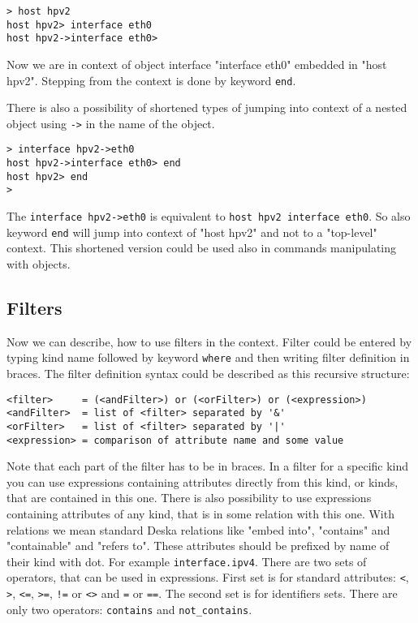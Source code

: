 \documentclass[deska]{subfiles}
\begin{document}
\begin{verbatim}
> host hpv2
host hpv2> interface eth0
host hpv2->interface eth0>
\end{verbatim}

Now we are in context of object interface "interface eth0" embedded in "host hpv2". Stepping from the context is done by
keyword {\tt end}.

There is also a possibility of shortened types of jumping into context of a nested object using {\tt ->} in the name of the
object.

\begin{verbatim}
> interface hpv2->eth0
host hpv2->interface eth0> end
host hpv2> end
>
\end{verbatim}

The {\tt interface hpv2->eth0} is equivalent to {\tt host hpv2 interface eth0}. So also keyword {\tt end} will jump into context of
"host hpv2" and not to a "top-level" context. This shortened version could be used also in commands manipulating with
objects.

\subsection{Filters}

Now we can describe, how to use filters in the context. Filter could be entered by typing kind name followed by keyword
{\tt where} and then writing filter definition in braces. The filter definition syntax could be described as this recursive
structure:

\begin{verbatim}
<filter>     = (<andFilter>) or (<orFilter>) or (<expression>)
<andFilter>  = list of <filter> separated by '&'
<orFilter>   = list of <filter> separated by '|'
<expression> = comparison of attribute name and some value
\end{verbatim}

Note that each part of the filter has to be in braces. In a filter for a specific kind you can use expressions containing
attributes directly from this kind, or kinds, that are contained in this one. There is also possibility to use expressions
containing attributes of any kind, that is in some relation with this one. With relations we mean standard Deska relations
like "embed into", "contains" and "containable" and "refers to". These attributes should be prefixed by name of their
kind with dot. For example {\tt interface.ipv4}. There are two sets of operators, that can be used in expressions. First
set is for standard attributes: {\tt <}, {\tt >}, {\tt <=}, {\tt >=}, {\tt !=} or {\tt <>} and {\tt =} or {\tt ==}.
The second set is for identifiers sets. There are only two operators: {\tt contains} and {\tt not\_contains}.
\end{document}
